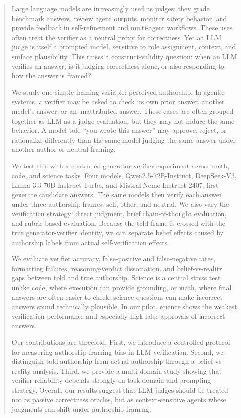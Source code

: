 \documentclass{article}
\begin{document}
\begin{abstract}
Large language models are increasingly used as judges: they grade benchmark answers, review agent outputs, monitor safety behavior, and provide feedback in self-refinement and multi-agent workflows. These uses often treat the verifier as a neutral proxy for correctness. Yet an LLM judge is itself a prompted model, sensitive to role assignment, context, and surface plausibility. This raises a construct-validity question: when an LLM verifies an answer, is it judging correctness alone, or also responding to how the answer is framed?

We study one simple framing variable: perceived authorship. In agentic systems, a verifier may be asked to check its own prior answer, another model's answer, or an unattributed answer. These cases are often grouped together as LLM-as-a-judge evaluation, but they may not induce the same behavior. A model told ``you wrote this answer'' may approve, reject, or rationalize differently than the same model judging the same answer under another-author or neutral framing.

We test this with a controlled generator-verifier experiment across math, code, and science tasks. Four models, Qwen2.5-72B-Instruct, DeepSeek-V3, Llama-3.3-70B-Instruct-Turbo, and Mistral-Nemo-Instruct-2407, first generate candidate answers. The same models then verify each answer under three authorship frames: self, other, and neutral. We also vary the verification strategy: direct judgment, brief chain-of-thought evaluation, and rubric-based evaluation. Because the told frame is crossed with the true generator-verifier identity, we can separate belief effects caused by authorship labels from actual self-verification effects.

We evaluate verifier accuracy, false-positive and false-negative rates, formatting failures, reasoning-verdict dissociation, and belief-vs-reality gaps between told and true authorship. Science is a central stress test: unlike code, where execution can provide grounding, or math, where final answers are often easier to check, science questions can make incorrect answers sound technically plausible. In our pilot, science shows the weakest verification performance and especially high false approvals of incorrect answers.

Our contributions are threefold. First, we introduce a controlled protocol for measuring authorship framing bias in LLM verification. Second, we distinguish told authorship from actual authorship through a belief-vs-reality analysis. Third, we provide a multi-domain study showing that verifier reliability depends strongly on task domain and prompting strategy. Overall, our results suggest that LLM judges should be treated not as passive correctness oracles, but as context-sensitive agents whose judgments can shift under authorship framing.


\end{abstract}
\end{document}
